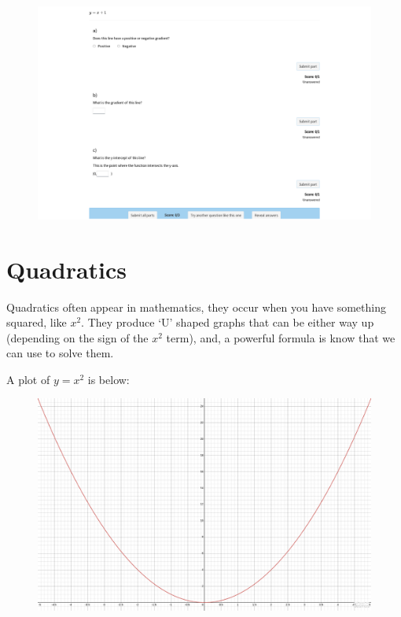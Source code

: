 \documentclass[
  a4paper,
]{scrbook}
\begin{document}
\begin{figure}

{\centering 

\href{https://numbas.mathcentre.ac.uk/question/104226/linear-graphs-reading-gradient-and-intercept-from-an-equation/embed/?token=2d71329a-7508-4dfa-9115-96abe822746a}{\includegraphics{./06-straight_line_graphs_files/figure-pdf/unnamed-chunk-7-1.png}}

}

\end{figure}


\hypertarget{quadratics}{%
\chapter{Quadratics}\label{quadratics}}

Quadratics often appear in mathematics, they occur when you have
something squared, like \(x^2\). They produce `U' shaped graphs that can
be either way up (depending on the sign of the \(x^2\) term), and, a
powerful formula is know that we can use to solve them.

A plot of \(y=x^2\) is below:

\begin{figure}

{\centering 

\href{https://www.desmos.com/calculator/ufd5zwqegu?embed}{\includegraphics{./07-quadratics_files/figure-pdf/unnamed-chunk-1-1.png}}

}

\end{figure}
\end{document}
